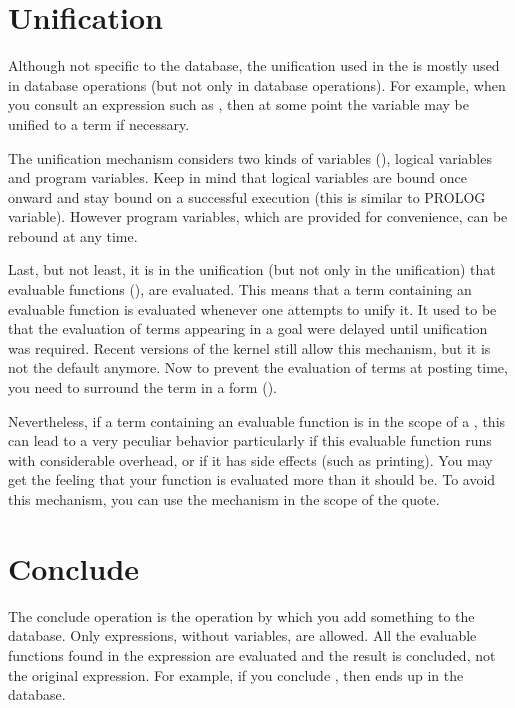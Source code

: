 \section{Unification}

Although not specific to the database, the unification used in the \CPK{} is
mostly used in database operations (but not only in database operations). For
example, when you consult an expression such as , then at some
point the  variable may be unified to a term if necessary.

The unification mechanism considers two kinds of variables
(), logical variables and program variables. Keep in mind that
logical variables are bound once onward and stay bound on a successful
execution (this is similar to PROLOG variable). However program variables,
which are provided for convenience, can be rebound at any time.

Last, but not least, it is in the unification (but not only in the unification)
that evaluable functions (), are evaluated.  This
means that a term containing an evaluable function is evaluated whenever one
attempts to unify it. It used to be that the evaluation of terms appearing in a
goal were delayed until unification was required.  Recent versions of the kernel
still allow this mechanism, but it is not the default anymore. Now to prevent
the evaluation of terms at posting time, you need to surround the term in a
 form ().

Nevertheless, if a term containing an evaluable function is in the scope of a
, this can lead to a very peculiar behavior particularly if this
evaluable function runs with considerable overhead, or if it has side effects
(such as printing). You may get the feeling that your function is evaluated
more than it should be. To avoid this mechanism, you can use the 
mechanism in the scope of the quote.

\section{Conclude}

The conclude operation is the operation by which you add something to the
database. Only expressions, without variables, are allowed. All the evaluable
functions found in the expression are evaluated and the result is concluded,
not the original expression. For example, if you conclude , then  ends up in the database.


